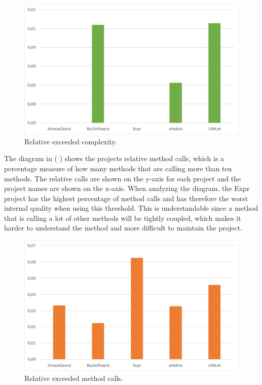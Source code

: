 \documentclass[conference]{IEEEtran}
\begin{document}
\begin{figure}
	\includegraphics[width=\columnwidth]{img/rel_exceeded_complexity.png}
\caption{Relative exceeded complexity.}
\label{fig:exceed_complexity}
\end{figure}


The diagram in ( ) shows the projects relative method calls, which is a percentage measure of how many methods that are calling more than ten methods. The relative calls are shown on the y-axis for each project and the project names are shown on the x-axis. When analyzing the diagram, the Expr project has the highest percentage of method calls and has therefore the worst internal quality when using this threshold. This is understandable since a method that is calling a lot of other methods will be tightly coupled, which makes it harder to understand the method and more difficult to maintain the project. 


\begin{figure}
	\includegraphics[width=\columnwidth]{img/rel_exceeded_calls.png}
\caption{Relative exceeded method calls.}
\label{fig:exceed_calls}
\end{figure}
\end{document}
